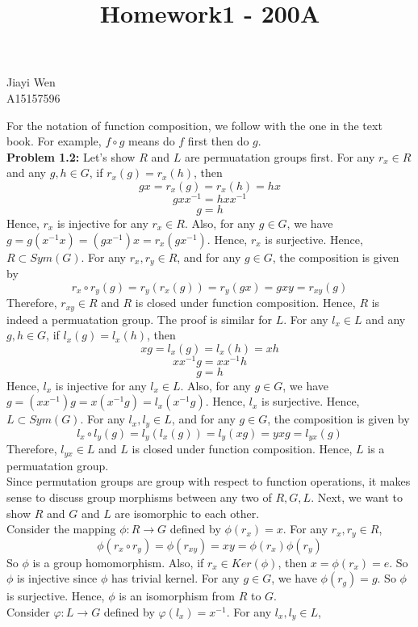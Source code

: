 \documentclass[12pt]{amsart}
\begin{document}
    \title{Homework1 - 200A}
    \maketitle
    \begin{center}
        Jiayi Wen\\
        A15157596
    \end{center}
    \indent For the notation of function composition, we follow with the one in the text book. For example, $f \circ g$ means do $f$ first then do $g$.\\
 \textbf{Problem 1.2:} Let's show $R$ and $L$ are permuatation groups first. For any $r_x\in R$ and any $g,h\in G$, if $r_x(g)=r_x(h)$, then 
 $$gx=r_x(g)=r_x(h)=hx$$
 \[gxx^{-1}=hxx^{-1}\]
 \[g=h\]
 Hence, $r_x$ is injective for any $r_x\in R$. Also, for any $g\in G$, we have $g=g(x^{-1}x)=(gx^{-1})x=r_x(gx^{-1})$. Hence, $r_x$ is surjective. Hence, $R\subset Sym(G)$. For any $r_x,r_y\in R$, and for any $g\in G$, the composition is given by 
 \[r_x\circ r_y(g)=r_y(r_x(g))=r_y(gx)=gxy=r_{xy}(g)\]
 Therefore, $r_{xy}\in R$ and $R$ is closed under function composition. Hence, $R$ is indeed a permuatation group.  
 The proof is similar for $L$. For any $l_x\in L$ and any $g,h\in G$, if $l_x(g)=l_x(h)$, then 
 $$xg=l_x(g)=l_x(h)=xh$$
 \[xx^{-1}g=xx^{-1}h\]
 \[g=h\]
 Hence, $l_x$ is injective for any $l_x\in L$. Also, for any $g\in G$, we have $g=(xx^{-1})g=x(x^{-1}g)=l_x(x^{-1}g)$. Hence, $l_x$ is surjective. Hence, $L\subset Sym(G)$. For any $l_x,l_y\in L$, and for any $g\in G$, the composition is given by 
 \[l_x\circ l_y(g)=l_y(l_x(g))=l_y(xg)=yxg=l_{yx}(g)\]
 Therefore, $l_{yx}\in L$ and $L$ is closed under function composition. Hence, $L$ is a permuatation group.\\
 Since permutation groups are group with respect to function operations, it makes sense to discuss group morphisms between any two of $R,G,L$. Next, we want to show $R$ and $G$ and $L$ are isomorphic to each other.\\
 Consider the mapping $\phi:R \rightarrow G$ defined by $\phi(r_x)=x$. For any $r_x,r_y\in R$,
 \[\phi(r_x\circ r_y)=\phi(r_{xy})=xy=\phi(r_x)\phi(r_y)\]
 So $\phi$ is a group homomorphism. Also, if $r_x\in Ker(\phi)$, then $x=\phi(r_x)=e$. So $\phi$ is injective since $\phi$ has trivial kernel. For any $g\in G$, we have $\phi(r_g)=g$. So $\phi$ is surjective. Hence, $\phi$ is an isomorphism from $R$ to $G$.\\
 Consider $\varphi:L\rightarrow G$ defined by $\varphi(l_x)=x^{-1}$. For any $l_x,l_y\in L$,
\end{document}
